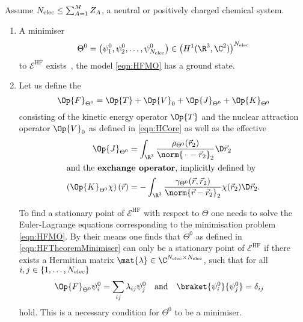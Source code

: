 \begin{thm}
	\label{thm:MathematicalHF}
	Assume $N_\text{elec} \leq \sum_{A=1}^M Z_A$, \ie a neutral or positively charged chemical system.
	\begin{enumerate}[label=(\alph*)]
		\item A minimiser
			\begin{equation}
				\Theta^0 = \left(\psi_1^0, \psi_2^0, \ldots, \psi_{\Nelec}^0 \right)
					\in \left( H^1(\R^3, \C^2) \right)^{\Nelec}
				\label{eqn:HFTheoremMinimiser}
			\end{equation}
			to $\mathcal{E}^\text{HF}$ exists~\cite{Lieb1977},
			\ie the \HF model \eqref{eqn:HFMO} has a ground state.
		\item Let us define the 
			\begin{equation}
				\Op{F}_{\Theta^0} = \Op{T} + \Op{V}_0 + \Op{J}_{\Theta^0} + \Op{K}_{\Theta^0}
				\label{eqn:FockOperator}
			\end{equation}
			consisting of the kinetic energy operator $\Op{T}$ and
			the nuclear attraction operator $\Op{V}_0$ as defined in \eqref{eqn:HCore}
			as well as the effective 
			\begin{align}
				\label{eqn:OperatorCoulomb}
					\Op{J}_{\Theta^0} &= \int_{\R^3} \frac{\rho_{\Theta^0}(\vec{r}_2)}
						{\norm{\slot - \vec{r}_2}_2} \D \vec{r}_2 \\
				\intertext{and the \newterm{exchange operator}, implicitly defined by}
					\left( \Op{K}_{\Theta^0} \chi \right)(\vec{r})
					&= - \int_{\R^3} \frac{\gamma_{\Theta^0}(\vec{r}, \vec{r}_2)}
						{\norm{\vec{r} - \vec{r}_2}_2} \chi(\vec{r}_2) \D \vec{r}_2.
				\label{eqn:OperatorExchange}
			\end{align}

			To find a stationary point of $\mathcal{E}^\text{HF}$ with respect to $\Theta$
			one needs to solve the Euler-Lagrange equations corresponding to the minimisation
			problem \eqref{eqn:HFMO}.
			By their means one finds that $\Theta^0$
			as defined in \eqref{eqn:HFTheoremMinimiser}
			can only be a stationary point of $\mathcal{E}^\text{HF}$ if
			there exists a Hermitian matrix $\mat{\lambda} \in \C^{\Nelec\times\Nelec}$,
			such that for all $i,j \in \{1,\ldots,N_\text{elec}\}$
			\begin{align}
				\label{eqn:EulerLagrangeHF}
				\Op{F}_{\Theta^0} \psi_i^0 &= \sum_{ij} \lambda_{ij} \psi_j^0
				&&\text{and}&
				\braket{\psi_i^0}{\psi_j^0} &= \delta_{ij}
			\end{align}
			hold.
			This is a necessary condition for $\Theta^0$ to be a minimiser.


\end{enumerate}
\end{thm}

